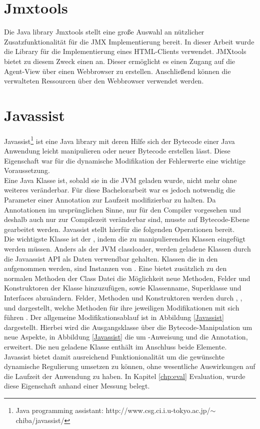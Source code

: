\section{Jmxtools}
Die Java library Jmxtools stellt eine gro\ss e Auswahl an n\"utzlicher Zusatzfunktionalit\"at f\"ur die JMX Implementierung bereit. In dieser Arbeit wurde die Library f\"ur die Implementierung eines HTML-Clients verwendet. JMXtools bietet zu diesem Zweck einen  an. Dieser erm\"oglicht es einen Zugang auf die Agent-View \"uber einen Webbrowser zu erstellen. Anschlie\ss end k\"onnen die verwalteten Ressourcen \"uber den Webbrowser verwendet werden.  

\section{Javassist}

Javassist\footnote{Java programming assistant: http://www.csg.ci.i.u-tokyo.ac.jp/$\sim$chiba/javassist/}  ist eine Java library mit deren Hilfe sich der Bytecode einer Java Anwendung leicht manipulieren oder neuer Bytecode erstellen l\"asst. Diese Eigenschaft war f\"ur die dynamische Modifikation der Fehlerwerte eine wichtige Voraussetzung.\\ Eine Java Klasse ist, sobald sie in die JVM geladen wurde, nicht mehr ohne weiteres ver\"anderbar. F\"ur diese Bachelorarbeit war es jedoch notwendig die Parameter einer Annotation zur Laufzeit modifizierbar zu halten. Da Annotationen im urspr\"unglichen Sinne, nur f\"ur den Compiler vorgesehen und deshalb auch nur zur Compilezeit ver\"anderbar sind, musste auf Bytecode-Ebene gearbeitet werden. Javassist stellt hierf\"ur die folgenden Operationen bereit.\\
Die wichtigste Klasse ist der , indem die zu manipulierenden Klassen eingef\"ugt werden m\"ussen. Anders als der JVM classloader, werden geladene Klassen durch die Javaassist API als Daten verwendbar gehalten. Klassen die in den  aufgenommen werden, sind Instanzen von . Eine  bietet zus\"atzlich zu den normalen Methoden der Class Datei die M\"oglichkeit neue Methoden, Felder und Konstruktoren der Klasse hinzuzuf\"ugen, sowie Klassenname, Superklasse und Interfaces abzu\"andern. Felder, Methoden und Konstruktoren werden durch , , und  dargestellt, welche Methoden f\"ur ihre jeweiligen Modifikationen mit sich f\"uhren \cite{JavaAssi}. Der allgemeine Modifikationsablauf ist in Abbildung \ref{Javassist} dargestellt. Hierbei wird die Ausgangsklasse \"uber die Bytecode-Manipulation um neue Aspekte, in Abbildung \ref{Javassist} die um -Anweisung und die  Annotation, erweitert. Die neu geladene Klasse enth\"alt im Anschluss beide Elemente.\\
Javassist bietet damit ausreichend Funktionionalit\"at um die gew\"unschte dynamische Regulierung umsetzen zu k\"onnen, ohne wesentliche Auswirkungen auf die Laufzeit der Anwendung zu haben. In Kapitel \ref{chp:eval} Evaluation, wurde diese Eigenschaft anhand einer Messung belegt.


